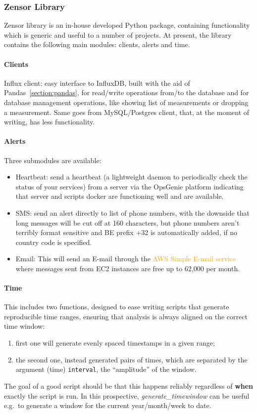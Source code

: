\subsubsection{Zensor Library}
Zensor library is an in-house developed Python package, containing functionality which is generic and useful to a number of projects. At present, the library contains the following main modules: 
clients, alerts and time.
\paragraph{Clients}
Influx client: easy interface to InfluxDB, built with the aid of Pandas~\ref{section:pandas}, for read/write operations from/to the database and for database management operations, like showing list of measurements or dropping a measurement.
Same goes from MySQL/Postgres client, that, at the moment of writing, has less functionality.
\paragraph{Alerts}
Three submodules are available:
\begin{itemize}
	\item Heartbeat: send a heartbeat (a lightweight daemon to periodically check the status of your services) from a server via the OpsGenie platform indicating that server and scripts docker are functioning well and are available.
	\item SMS: send an alert directly to list of phone numbers, with the downside that long messages will be cut off at 160 characters, but phone numbers aren't terribly format sensitive 
	and BE prefix +32 is automatically added, if no country code is specified.
	\item Email: This will send an E-mail through the \textcolor{orange}{AWS Simple E-mail service} where messages sent from EC2 instances are free up to 62,000 per month.
\end{itemize}
\paragraph{Time}
This includes two functions, designed to ease writing scripts that generate reproducible time ranges, ensuring that analysis is always aligned on the correct time window:
\begin{enumerate}
	\item first one will generate evenly spaced timestamps in a given range;
	\item the second one, instead generated pairs of times, which are separated by the argument (time) \texttt{interval}, the ``amplitude'' of the window.
\end{enumerate}
The goal of a good script should be that this happens reliably regardless of \textbf{when} exactly the script is run.
In this prospective, \textit{generate\_timewindow} can be useful e.g.\ to generate a window for the current year/month/week to date.

